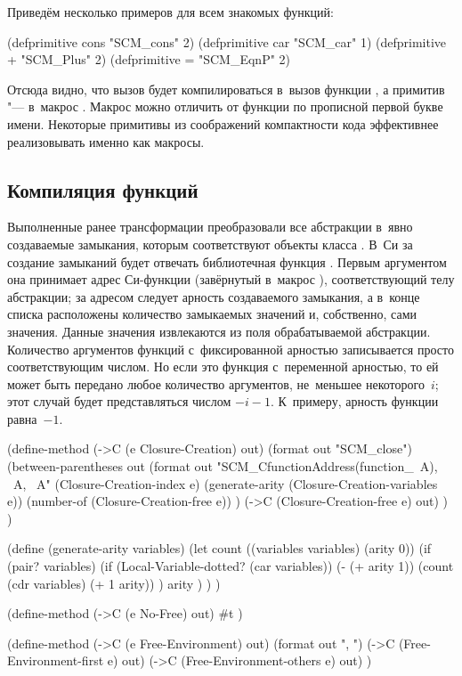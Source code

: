 Приведём несколько примеров для всем знакомых функций:

\begin{code:lisp}
(defprimitive cons "SCM_cons" 2)
(defprimitive car "SCM_car" 1)
(defprimitive + "SCM_Plus" 2)
(defprimitive = "SCM_EqnP" 2)
\end{code:lisp}

Отсюда видно, что вызов  будет компилироваться в~вызов функции
, а примитив~\ic{+} "--- в~макрос .
 Макрос можно отличить от функции по
прописной первой букве имени. Некоторые примитивы из соображений компактности
кода эффективнее реализовывать именно как макросы.


\subsection{Компиляция функций}\label{cc/gen/ssect:func}

Выполненные ранее трансформации преобразовали все абстракции в~явно создаваемые
замыкания, которым соответствуют объекты класса . В~Си за
создание замыканий будет отвечать библиотечная функция . Первым
аргументом она принимает адрес Си-функции (завёрнутый в~макрос
), соответствующий телу абстракции; за адресом следует
арность создаваемого замыкания, а в~конце списка расположены количество
замыкаемых значений и, собственно, сами значения. Данные значения извлекаются
из поля  обрабатываемой абстракции. Количество аргументов функций
с~фиксированной арностью записывается просто соответствующим числом.
Но если это функция с~переменной арностью, то ей может быть передано любое
количество аргументов, не~меньшее некоторого~$i$; этот случай будет
представляться числом $-i - 1$. К~примеру, арность функции  равна~$-1$.

\begin{code:lisp}
(define-method (->C (e Closure-Creation) out)
  (format out "SCM_close")
  (between-parentheses out
    (format out "SCM_CfunctionAddress(function_~A), ~A, ~A"
            (Closure-Creation-index e)
            (generate-arity (Closure-Creation-variables e))
            (number-of (Closure-Creation-free e)) )
    (->C (Closure-Creation-free e) out) ) )

(define (generate-arity variables)
  (let count ((variables variables) (arity 0))
    (if (pair? variables)
        (if (Local-Variable-dotted? (car variables))
            (- (+ arity 1))
            (count (cdr variables) (+ 1 arity)) )
        arity ) ) )

(define-method (->C (e No-Free) out)
  #t )

(define-method (->C (e Free-Environment) out)
  (format out ", ")
  (->C (Free-Environment-first e) out)
  (->C (Free-Environment-others e) out) )
\end{code:lisp}

